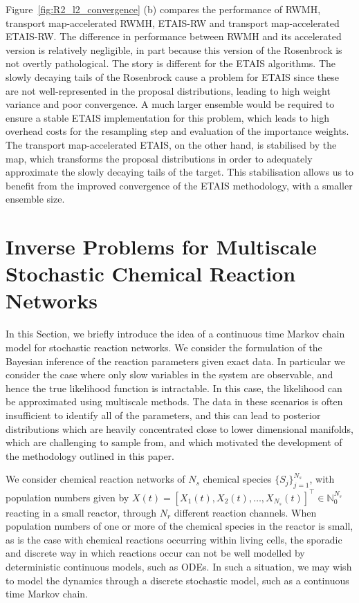 \documentclass[final]{siamltex}
\newcommand{\edit}[1]{{\color{red} #1}}
\begin{document}
Figure~\ref{fig:R2_l2_convergence} (b) compares the performance of
RWMH, transport map-accelerated RWMH, ETAIS-RW and transport
map-accelerated ETAIS-RW. The difference in performance between RWMH
and its accelerated version is relatively negligible, in part because
this version of the Rosenbrock is not overtly pathological. The story
is different for the ETAIS algorithms. The slowly decaying tails of
the Rosenbrock cause a problem for ETAIS since these are not
well-represented in the proposal distributions, leading to high weight
variance and poor convergence. A much larger
ensemble would be required to ensure a stable ETAIS implementation for this
problem, which leads to high overhead costs for the resampling step
and evaluation of the importance weights. The transport map-accelerated
ETAIS, on the other hand, is stabilised by the map, which transforms the proposal
distributions in order to adequately approximate the slowly decaying
tails of the target. This stabilisation allows us to benefit from the
improved convergence of the ETAIS methodology, with a smaller ensemble
size. 



\section{Inverse Problems for Multiscale Stochastic Chemical Reaction
  Networks}\label{sec:multi}
\edit{In this Section, we briefly introduce the idea of a continuous
  time Markov chain model for stochastic reaction networks. We consider the formulation of the Bayesian inference of
  the reaction parameters given exact data. In particular we consider
  the case where only slow variables in the system are observable, and
  hence the true likelihood function is intractable. In this case, the
  likelihood can be approximated using multiscale methods. The data in
  these scenarios is often insufficient to identify all of the
  parameters, and this can lead to posterior distributions which are
  heavily concentrated close to lower dimensional manifolds, which are
  challenging to sample from, and which motivated the development of
  the methodology outlined in this paper.}

We consider chemical reaction networks of $N_s$ chemical species $\{S_j\}_{j=1}^{N_s}$,
with population numbers given by $X(t) = [X_1(t), X_2(t), \ldots, X_{N_s}(t)]^\top \in
\mathbb{N}_0^{N_s}$ reacting in a small reactor, through $N_r$ different reaction
channels. When population numbers of one or more of the chemical
species in the reactor is small, as is the case with chemical
reactions occurring within living cells, the sporadic and discrete way
in which reactions occur can not be well modelled by deterministic
continuous models, such as ODEs. In such a situation, we may wish to
model the dynamics through a discrete stochastic model, such as a
continuous time Markov chain.
\end{document}

